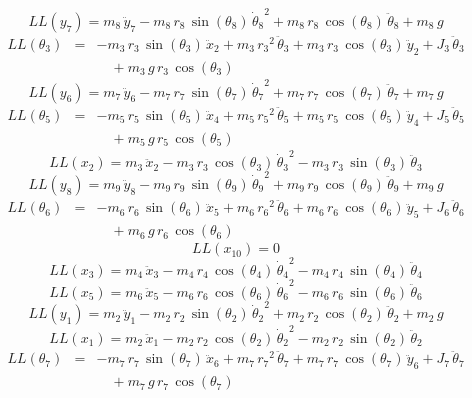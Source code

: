 \[ LL(y_{7}) = m_{8}\,{\ddot{y}_{7}} - m_{8}\,r_{8}\,\sin({\theta_{8}}
)\,{{\dot{\theta}_{8}}}^2 + m_{8}\,r_{8}\,\cos({\theta_{8}})\,{
\ddot{\theta}_{8}} + m_{8}\,g \]
\begin{eqnarray*} LL({\theta_{3}}) &=& -m_{3}\,r_{3}\,\sin({\theta_{3}
})\,{\ddot{x}_{2}} + m_{3}\,{r_{3}}^2\,{\ddot{\theta}_{3}} + m_{3}\,r
_{3}\,\cos({\theta_{3}})\,{\ddot{y}_{2}} + J_{3}\,{\ddot{\theta}_{3}}
 \\ &&\quad\mbox{} + m_{3}\,g\,r_{3}\,\cos({\theta_{3}})
 \end{eqnarray*}
\[ LL(y_{6}) = m_{7}\,{\ddot{y}_{6}} - m_{7}\,r_{7}\,\sin({\theta_{7}}
)\,{{\dot{\theta}_{7}}}^2 + m_{7}\,r_{7}\,\cos({\theta_{7}})\,{
\ddot{\theta}_{7}} + m_{7}\,g \]
\begin{eqnarray*} LL({\theta_{5}}) &=& -m_{5}\,r_{5}\,\sin({\theta_{5}
})\,{\ddot{x}_{4}} + m_{5}\,{r_{5}}^2\,{\ddot{\theta}_{5}} + m_{5}\,r
_{5}\,\cos({\theta_{5}})\,{\ddot{y}_{4}} + J_{5}\,{\ddot{\theta}_{5}}
 \\ &&\quad\mbox{} + m_{5}\,g\,r_{5}\,\cos({\theta_{5}})
 \end{eqnarray*}
\[ LL(x_{2}) = m_{3}\,{\ddot{x}_{2}} - m_{3}\,r_{3}\,\cos({\theta_{3}}
)\,{{\dot{\theta}_{3}}}^2 - m_{3}\,r_{3}\,\sin({\theta_{3}})\,{
\ddot{\theta}_{3}} \]
\[ LL(y_{8}) = m_{9}\,{\ddot{y}_{8}} - m_{9}\,r_{9}\,\sin({\theta_{9}}
)\,{{\dot{\theta}_{9}}}^2 + m_{9}\,r_{9}\,\cos({\theta_{9}})\,{
\ddot{\theta}_{9}} + m_{9}\,g \]
\begin{eqnarray*} LL({\theta_{6}}) &=& -m_{6}\,r_{6}\,\sin({\theta_{6}
})\,{\ddot{x}_{5}} + m_{6}\,{r_{6}}^2\,{\ddot{\theta}_{6}} + m_{6}\,r
_{6}\,\cos({\theta_{6}})\,{\ddot{y}_{5}} + J_{6}\,{\ddot{\theta}_{6}}
 \\ &&\quad\mbox{} + m_{6}\,g\,r_{6}\,\cos({\theta_{6}})
 \end{eqnarray*}
\[ LL(x_{10}) = 0 \]
\[ LL(x_{3}) = m_{4}\,{\ddot{x}_{3}} - m_{4}\,r_{4}\,\cos({\theta_{4}}
)\,{{\dot{\theta}_{4}}}^2 - m_{4}\,r_{4}\,\sin({\theta_{4}})\,{
\ddot{\theta}_{4}} \]
\[ LL(x_{5}) = m_{6}\,{\ddot{x}_{5}} - m_{6}\,r_{6}\,\cos({\theta_{6}}
)\,{{\dot{\theta}_{6}}}^2 - m_{6}\,r_{6}\,\sin({\theta_{6}})\,{
\ddot{\theta}_{6}} \]
\[ LL(y_{1}) = m_{2}\,{\ddot{y}_{1}} - m_{2}\,r_{2}\,\sin({\theta_{2}}
)\,{{\dot{\theta}_{2}}}^2 + m_{2}\,r_{2}\,\cos({\theta_{2}})\,{
\ddot{\theta}_{2}} + m_{2}\,g \]
\[ LL(x_{1}) = m_{2}\,{\ddot{x}_{1}} - m_{2}\,r_{2}\,\cos({\theta_{2}}
)\,{{\dot{\theta}_{2}}}^2 - m_{2}\,r_{2}\,\sin({\theta_{2}})\,{
\ddot{\theta}_{2}} \]
\begin{eqnarray*} LL({\theta_{7}}) &=& -m_{7}\,r_{7}\,\sin({\theta_{7}
})\,{\ddot{x}_{6}} + m_{7}\,{r_{7}}^2\,{\ddot{\theta}_{7}} + m_{7}\,r
_{7}\,\cos({\theta_{7}})\,{\ddot{y}_{6}} + J_{7}\,{\ddot{\theta}_{7}}
 \\ &&\quad\mbox{} + m_{7}\,g\,r_{7}\,\cos({\theta_{7}})
 \end{eqnarray*}
